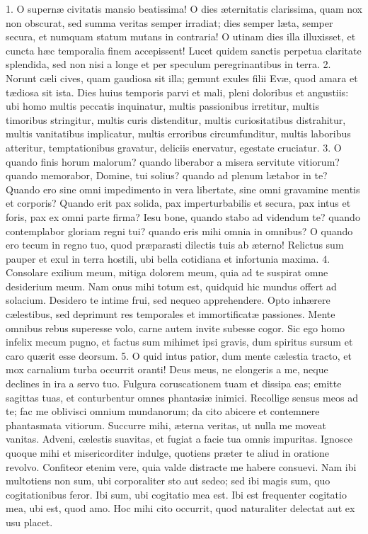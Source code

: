 1. O supernæ civitatis mansio beatissima! O dies æternitatis clarissima, quam nox non obscurat, sed summa veritas semper irradiat; dies semper læta, semper secura, et numquam statum mutans in contraria! O utinam dies illa illuxisset, et cuncta hæc temporalia finem accepissent! Lucet quidem sanctis perpetua claritate splendida, sed non nisi a longe et per speculum peregrinantibus in terra.
2. Norunt cæli cives, quam gaudiosa sit illa; gemunt exules filii Evæ, quod amara et tædiosa sit ista. Dies huius temporis parvi et mali, pleni doloribus et angustiis: ubi homo multis peccatis inquinatur, multis passionibus irretitur, multis timoribus stringitur, multis curis distenditur, multis curiositatibus distrahitur, multis vanitatibus implicatur, multis erroribus circumfunditur, multis laboribus atteritur, temptationibus gravatur, deliciis enervatur, egestate cruciatur.
3. O quando finis horum malorum? quando liberabor a misera servitute vitiorum? quando memorabor, Domine, tui solius? quando ad plenum lætabor in te? Quando ero sine omni impedimento in vera libertate, sine omni gravamine mentis et corporis? Quando erit pax solida, pax imperturbabilis et secura, pax intus et foris, pax ex omni parte firma? Iesu bone, quando stabo ad videndum te? quando contemplabor gloriam regni tui? quando eris mihi omnia in omnibus? O quando ero tecum in regno tuo, quod præparasti dilectis tuis ab æterno! Relictus sum pauper et exul in terra hostili, ubi bella cotidiana et infortunia maxima.
4. Consolare exilium meum, mitiga dolorem meum, quia ad te suspirat omne desiderium meum. Nam onus mihi totum est, quidquid hic mundus offert ad solacium. Desidero te intime frui, sed nequeo apprehendere. Opto inhærere cælestibus, sed deprimunt res temporales et immortificatæ passiones. Mente omnibus rebus superesse volo, carne autem invite subesse cogor. Sic ego homo infelix mecum pugno, et factus sum mihimet ipsi gravis, dum spiritus sursum et caro quærit esse deorsum.
5. O quid intus patior, dum mente cælestia tracto, et mox carnalium turba occurrit oranti! Deus meus, ne elongeris a me, neque declines in ira a servo tuo. Fulgura coruscationem tuam et dissipa eas; emitte sagittas tuas, et conturbentur omnes phantasiæ inimici. Recollige sensus meos ad te; fac me oblivisci omnium mundanorum; da cito abicere et contemnere phantasmata vitiorum. Succurre mihi, æterna veritas, ut nulla me moveat vanitas. Adveni, cælestis suavitas, et fugiat a facie tua omnis impuritas. Ignosce quoque mihi et misericorditer indulge, quotiens præter te aliud in oratione revolvo. Confiteor etenim vere, quia valde distracte me habere consuevi. Nam ibi multotiens non sum, ubi corporaliter sto aut sedeo; sed ibi magis sum, quo cogitationibus feror. Ibi sum, ubi cogitatio mea est. Ibi est frequenter cogitatio mea, ubi est, quod amo. Hoc mihi cito occurrit, quod naturaliter delectat aut ex usu placet.
